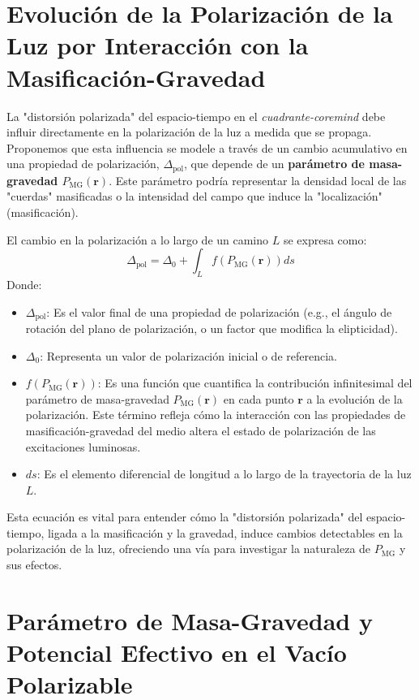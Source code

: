 \documentclass{book}
\begin{document}
\section*{Evolución de la Polarización de la Luz por Interacción con la Masificación-Gravedad}
\label{sec:light_polarization_evolution}

La "distorsión polarizada" del espacio-tiempo en el \textit{cuadrante-coremind} debe influir directamente en la polarización de la luz a medida que se propaga. Proponemos que esta influencia se modele a través de un cambio acumulativo en una propiedad de polarización, $\Delta_{\text{pol}}$, que depende de un \textbf{parámetro de masa-gravedad $P_{\text{MG}}(\mathbf{r})$}. Este parámetro podría representar la densidad local de las "cuerdas" masificadas o la intensidad del campo que induce la "localización" (masificación).

El cambio en la polarización a lo largo de un camino $L$ se expresa como:
\begin{equation}
    \Delta_{\text{pol}} = \Delta_0 + \int_{L} f(P_{\text{MG}}(\mathbf{r})) ds
    \label{eq:polarization_evolution}
\end{equation}
Donde:
\begin{itemize}
    \item $\Delta_{\text{pol}}$: Es el valor final de una propiedad de polarización (e.g., el ángulo de rotación del plano de polarización, o un factor que modifica la elipticidad).
    \item $\Delta_0$: Representa un valor de polarización inicial o de referencia.
    \item $f(P_{\text{MG}}(\mathbf{r}))$: Es una función que cuantifica la contribución infinitesimal del parámetro de masa-gravedad $P_{\text{MG}}(\mathbf{r})$ en cada punto $\mathbf{r}$ a la evolución de la polarización. Este término refleja cómo la interacción con las propiedades de masificación-gravedad del medio altera el estado de polarización de las excitaciones luminosas.
    \item $ds$: Es el elemento diferencial de longitud a lo largo de la trayectoria de la luz $L$.
\end{itemize}
Esta ecuación es vital para entender cómo la "distorsión polarizada" del espacio-tiempo, ligada a la masificación y la gravedad, induce cambios detectables en la polarización de la luz, ofreciendo una vía para investigar la naturaleza de $P_{\text{MG}}$ y sus efectos.

\section*{Parámetro de Masa-Gravedad y Potencial Efectivo en el Vacío Polarizable}
\label{sec:pmg_umg}
\end{document}
